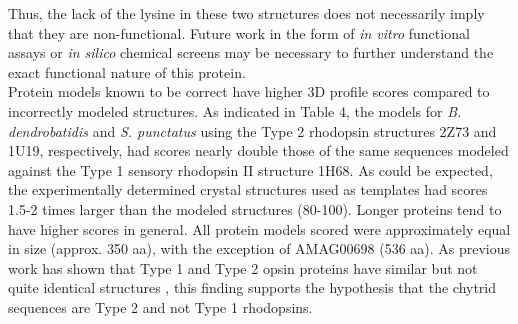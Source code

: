 \indent Thus, the lack of the lysine in these two structures does not necessarily imply that they are non-functional. Future work in the form of \textit{in vitro} functional assays or \textit{in silico} chemical screens may be necessary to further understand the exact functional nature of this protein.\\
\indent Protein models known to be correct have higher 3D profile scores \cite{Luthy1992} compared to incorrectly modeled structures. As indicated in Table 4, the models for \textit{B. dendrobatidis} and \textit{S. punctatus} using the Type 2 rhodopsin structures 2Z73 and 1U19, respectively, had scores nearly double those of the same sequences modeled against the Type 1 sensory rhodopsin II structure 1H68. As could be expected, the experimentally determined crystal structures used as templates had scores 1.5-2 times larger than the modeled structures (80-100). Longer proteins tend to have higher scores in general. All protein models scored were approximately equal in size (approx. 350 aa), with the exception of AMAG00698 (536 aa). As previous work has shown that Type 1 and Type 2 opsin proteins have similar but not quite identical structures \cite{Spudich2000}, this finding supports the hypothesis that the chytrid sequences are Type 2 and not Type 1 rhodopsins.\\

